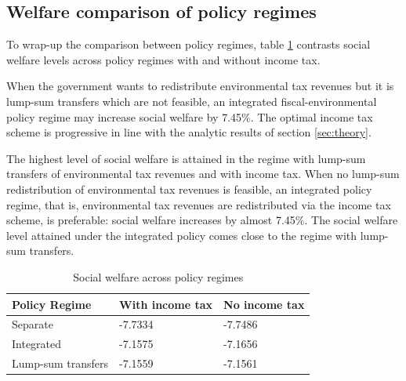 \subsection{Welfare comparison of policy regimes}

To wrap-up the comparison between policy regimes, table \ref{tab:swf} contrasts social welfare levels across policy regimes with and without income tax.

When the government wants to redistribute environmental tax revenues but it is lump-sum transfers which  are not feasible, an integrated fiscal-environmental policy regime may increase social welfare by 7.45\%. The optimal income tax scheme is progressive in line with the analytic results of section \ref{sec:theory}. 


The highest level of social welfare is attained in the regime with lump-sum transfers of environmental tax revenues and with income tax. When no lump-sum redistribution of environmental tax revenues is feasible, an integrated policy regime, that is, environmental tax revenues are redistributed via the income tax scheme, is preferable: social welfare increases by almost 7.45\%.  The social welfare level attained under the integrated policy comes close to the regime with lump-sum transfers. 
\begin{table}\caption{Social welfare across policy regimes}\label{tab:swf}
	\begin{tabular}{l|ll}
		Policy Regime & With income tax & No income tax\\ 
		\hline 
		Separate & -7.7334 & -7.7486 \\
		Integrated&-7.1575 & -7.1656\\
		Lump-sum transfers & -7.1559 & -7.1561\\
		\hline 
	\end{tabular}
\end{table}

